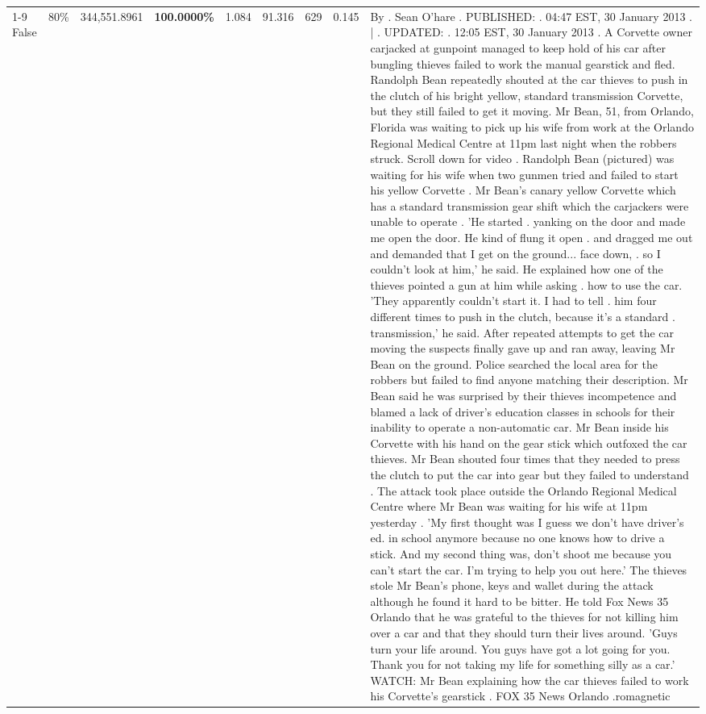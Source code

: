 \begin{table}[H]
\begin{tabular}{lllrlllll}
\cline{1-9} \cline{2-9}
False & 80\% & 344,551.8961 & \bfseries \color{red} 100.0000\% & 1.084 & 91.316 & 629 & 0.145 & By . Sean O'hare . PUBLISHED: . 04:47 EST, 30 January 2013 . | . UPDATED: . 12:05 EST, 30 January 2013 . A Corvette owner carjacked at gunpoint managed to keep hold of his car after bungling thieves failed to work the manual gearstick and fled. Randolph Bean repeatedly shouted at the car thieves to push in the clutch of his bright yellow, standard transmission Corvette, but they still failed to get it moving. Mr Bean, 51, from Orlando, Florida was waiting to pick up his wife from work at the Orlando Regional Medical Centre at 11pm last night when the robbers struck. Scroll down for video . Randolph Bean (pictured) was waiting for his wife when two gunmen tried and failed to start his yellow Corvette . Mr Bean's canary yellow Corvette which has a standard transmission gear shift which the carjackers were unable to operate . 'He started . yanking on the door and made me open the door. He kind of flung it open . and dragged me out and demanded that I get on the ground... face down, . so I couldn't look at him,' he said. He explained how one of the thieves pointed a gun at him while asking . how to use the car. 'They apparently couldn't start it. I had to tell . him four different times to push in the clutch, because it's a standard . transmission,' he said. After repeated attempts to get the car moving the suspects finally gave up and ran away, leaving Mr Bean on the ground. Police searched the local area for the robbers but failed to find anyone matching their description. Mr Bean said he was surprised by their thieves incompetence and blamed a lack of driver's education classes in schools for their inability to operate a non-automatic car. Mr Bean inside his Corvette with his hand on the gear stick which outfoxed the car thieves. Mr Bean shouted four times that they needed to press the clutch to put the car into gear but they failed to understand . The attack took place outside the Orlando Regional Medical Centre where Mr Bean was waiting for his wife at 11pm yesterday . 'My first thought was I guess we don't have driver's ed. in school anymore because no one knows how to drive a stick. And my second thing was, don't shoot me because you can't start the car. I'm trying to help you out here.' The thieves stole Mr Bean's phone, keys and wallet during the attack although he found it hard to be bitter. He told Fox News 35 Orlando that he was grateful to the thieves for not killing him over a car and that they should turn their lives around. 'Guys turn your life around. You guys have got a lot going for you. Thank you for not taking my life for something silly as a car.' WATCH: Mr Bean explaining how the car thieves failed to work his Corvette's gearstick . FOX 35 News Orlando .romagnetic \\

\end{tabular}
\end{table}
